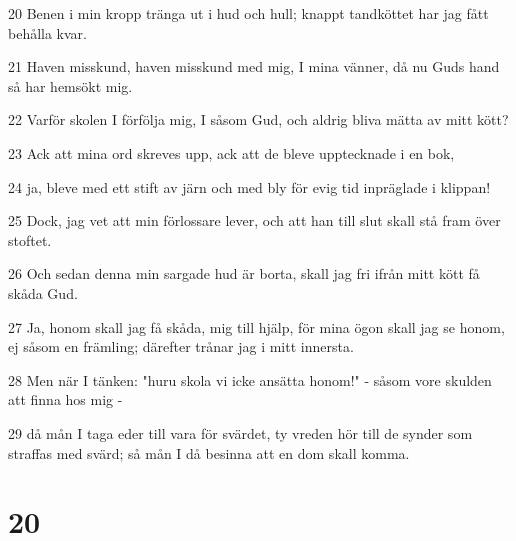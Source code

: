 \par 20 Benen i min kropp tränga ut i hud och hull; knappt tandköttet har jag fått behålla kvar.
\par 21 Haven misskund, haven misskund med mig, I mina vänner, då nu Guds hand så har hemsökt mig.
\par 22 Varför skolen I förfölja mig, I såsom Gud, och aldrig bliva mätta av mitt kött?
\par 23 Ack att mina ord skreves upp, ack att de bleve upptecknade i en bok,
\par 24 ja, bleve med ett stift av järn och med bly för evig tid inpräglade i klippan!
\par 25 Dock, jag vet att min förlossare lever, och att han till slut skall stå fram över stoftet.
\par 26 Och sedan denna min sargade hud är borta, skall jag fri ifrån mitt kött få skåda Gud.
\par 27 Ja, honom skall jag få skåda, mig till hjälp, för mina ögon skall jag se honom, ej såsom en främling; därefter trånar jag i mitt innersta.
\par 28 Men när I tänken: "huru skola vi icke ansätta honom!" - såsom vore skulden att finna hos mig -
\par 29 då mån I taga eder till vara för svärdet, ty vreden hör till de synder som straffas med svärd; så mån I då besinna att en dom skall komma.

\chapter{20}

